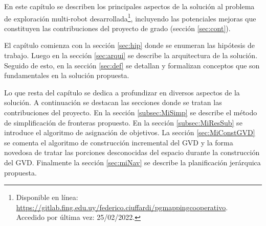 En este capítulo se describen los principales aspectos de la solución al
problema de exploración multi-robot desarrollada\footnote{Disponible en
línea:\\
\url{https://gitlab.fing.edu.uy/federico.ciuffardi/pgmappingcooperativo}.\\ Accedido por última vez: 25/02/2022.},
incluyendo las potenciales mejoras que constituyen las contribuciones del
proyecto de grado (sección \ref{sec:cont}).

El capítulo comienza con la sección \ref{sec:hip} donde se enumeran las
hipótesis de trabajo. Luego en la sección \ref{sec:arqui} se describe la
arquitectura de la solución. Seguido de esto, en la sección \ref{sec:def} se
detallan y formalizan conceptos que son fundamentales en la solución propuesta.

Lo que resta del capítulo se dedica a profundizar en diversos aspectos de la
solución. A continuación se destacan las secciones donde se tratan las
contribuciones del proyecto. En la sección \ref{subsec:MiSimp} se describe el
método de simplificación de fronteras propuesto. En la sección
\ref{subsec:MiResSub} se introduce el algoritmo de asignación de objetivos. La sección
\ref{sec:MiConstGVD} se comenta el algoritmo de
construcción incremental del GVD y la forma novedosa de tratar
las porciones desconocidas del espacio durante la construcción del GVD.
Finalmente la sección \ref{sec:miNav} se describe la planificación jerárquica
propuesta.




